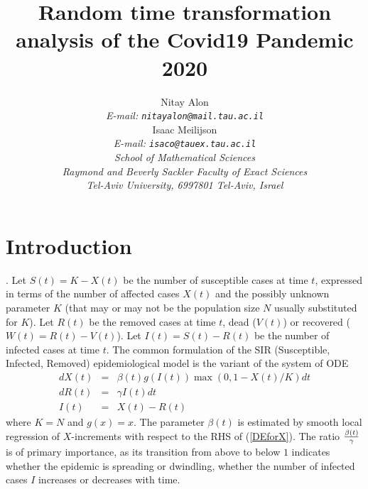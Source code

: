 \documentclass{article}
\begin{document}
\title {Random time transformation analysis of the Covid19 Pandemic 2020}

\author {
Nitay Alon
\\
{\em E-mail: \tt{nitayalon@mail.tau.ac.il}} \\
Isaac Meilijson
\\
{\em E-mail: \tt{isaco@tauex.tau.ac.il}} \\
{\em School of Mathematical Sciences} \\
{\em Raymond and Beverly Sackler Faculty of Exact Sciences} \\
{\em Tel-Aviv University, 6997801 Tel-Aviv, Israel} \\
}


\maketitle


\begin{abstract}



%
\end{abstract}





\section{Introduction} \label{introduction}

. Let $S(t) = K - X(t)$ be the number of susceptible cases at time $t$, expressed in terms of the number of affected cases $X(t)$ and the possibly unknown parameter $K$ (that may or may not be the population size $N$ usually substituted for $K$). Let $R(t)$ be the removed cases at time $t$, dead ($V(t)$) or recovered ($W(t)=R(t)-V(t)$). Let $I(t)=S(t)-R(t)$ be the number of infected cases at time $t$. The common formulation of the SIR (Susceptible, Infected, Removed) epidemiological model is the variant of the system of ODE
\begin{eqnarray}
dX(t) & = & \beta(t) g(I(t)) \max(0,1 - X(t)/K) dt \label{DEforX} \\
dR(t) & = & \gamma I(t) \label{DEforR} dt \\
I(t) & = & X(t)-R(t) \label{eqforI}
\end{eqnarray}
where $K=N$ and $g(x)=x$. The parameter $\beta(t)$ is estimated by smooth local regression of \linebreak $X$-increments with respect to the RHS of (\ref{DEforX}). The ratio ${{\beta(t)} \over \gamma}$ is of primary importance, as its transition from above to below $1$ indicates whether the epidemic is spreading or dwindling, whether the number of infected cases $I$ increases or decreases with time.
\end{document}
